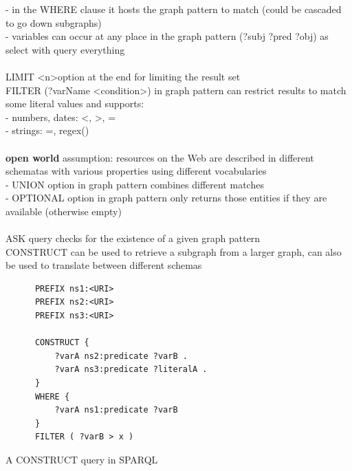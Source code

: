 - in the WHERE clause it hosts the graph pattern to match (could be cascaded to go down subgraphs) \\
- variables can occur at any place in the graph pattern (?subj ?pred ?obj) as select with query everything \\
\\
LIMIT \textless n\textgreater option at the end for limiting the result set \\
FILTER (?varName \textless condition\textgreater ) in graph pattern can restrict results to match some
literal values and supports: \\
- numbers, dates: \textless, \textgreater, = \\
- strings: =, regex() \\
\\
\textbf{open world} assumption: resources on the Web are described in different schematas with various properties
using different vocabularies \\
- UNION option in graph pattern combines different matches \\
- OPTIONAL option in graph pattern only returns those entities if they are available (otherwise empty) \\
\\
ASK query checks for the existence of a given graph pattern \\
CONSTRUCT can be used to retrieve a subgraph from a larger graph, can also be used to translate between different schemas \\

\begin{listing}[H]
	\begin{verbatim}
	  PREFIX ns1:<URI>
	  PREFIX ns2:<URI>
	  PREFIX ns3:<URI>

	  CONSTRUCT {
	      ?varA ns2:predicate ?varB .
	      ?varA ns3:predicate ?literalA .
	  }
	  WHERE {
	      ?varA ns1:predicate ?varB
	  }
	  FILTER ( ?varB > x )
	\end{verbatim}
\caption{A CONSTRUCT query in \gls{SPARQL}}
\label{lst:construct_sparql}
\end{listing}

